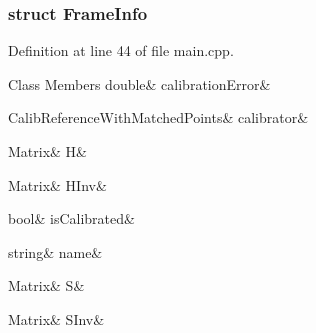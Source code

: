 \subsubsection{struct Frame\+Info}


Definition at line 44 of file main.\+cpp.

\begin{DoxyFields}{Class Members}
\mbox{\label{group__referenceFrameHandler_a4099edbc00b7bc2e84093a19590d31d0}} 
double&
calibrationError&
\\
\hline

\mbox{\label{group__referenceFrameHandler_a16e20925f072bca955dd1e27eb2f31ca}} 
CalibReferenceWithMatchedPoints&
calibrator&
\\
\hline

\mbox{\label{group__referenceFrameHandler_a0b26689835498c777fd921b6464bb50e}} 
Matrix&
H&
\\
\hline

\mbox{\label{group__referenceFrameHandler_a6d366877775d76de58c1f11e08b414e6}} 
Matrix&
HInv&
\\
\hline

\mbox{\label{group__referenceFrameHandler_a297eee5ae6d87c41a0cfb335a331fd16}} 
bool&
isCalibrated&
\\
\hline

\mbox{\label{group__referenceFrameHandler_a409b52019fa5193cd87b5f50ce4a868d}} 
string&
name&
\\
\hline

\mbox{\label{group__referenceFrameHandler_a785143035c91d0e96169361af95d45f3}} 
Matrix&
S&
\\
\hline

\mbox{\label{group__referenceFrameHandler_a3c0e502106b71a211f8a15346bcbd289}} 
Matrix&
SInv&
\\
\hline

\end{DoxyFields}
\label{classFrameHandlerModule}
